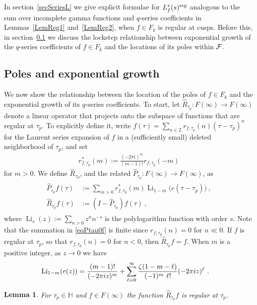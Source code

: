 \documentclass[11pt,a4paper]{article}
\newtheorem{lem}[thm]{Lemma}
\def\Z{\mathbb{Z}}
\newcommand{\Li}{\operatorname{Li}}     			%
\newcommand{\HH}{{\mathbb H}}				%
\newcommand{\reg}{{\rm reg}}
\newcommand{\PF}{\widehat{P}} 				%
\newcommand{\RF}{\widehat{R}} 				%
\begin{document}
In section~\ref{secSeriesL} we give explicit formulae for  $L_f^*(s)^\reg$ analogous to the sum over incomplete gamma functions and $q$-series coefficients in Lemmas~\ref{LemReg1} and~\ref{LemReg2}, when $f \in F_k$ is regular at cusps. Before this, in section~\ref{secGrowLF} we discuss the lockstep relationship between exponential growth of the $q$-series coefficients of $f \in F_k$ and the locations of its poles within ${\cal F}$.

\subsection{Poles and exponential growth}\label{secGrowLF}

We now show the relationship between the location of the poles of $f \in F_k$ and the exponential growth of its $q$-series coefficients. To start, let $\RF_{\tau_p}:F(\infty)\to F(\infty)$ denote a linear operator that projects onto the subspace of functions that are regular at $\tau_p$. To explicitly define it, write $f(\tau)=\sum_{n\in \Z} r_{f,\tau_p}(n) (\tau-\tau_p)^n$ for the Laurent series expansion of $f$ in a (sufficiently small) deleted neighborhood of $\tau_p$, and set
\begin{align}
\label{eqRstar}
r^*_{f,\tau_p}(m):=\frac{(-2\pi i)^m}{(m-1)!}r_{f,\tau_p}(-m)
\end{align} 
for $m>0$. We define $\RF_{\tau_P}$, and the related $\PF_{\tau_p}: F(\infty) \to F(\infty)$, as
\begin{align}
\label{eqPtau0f}
\begin{split}
\PF_{\tau_p}f(\tau)&:=\sum_{m>0}r^*_{f,\tau_p}(m)\Li_{1-m}\big(e(\tau-\tau_p)\big)~,\\
\RF_{\tau_p}f(\tau)&:=(I-\PF_{\tau_p})f(\tau)~,
\end{split}
\end{align}
where $\Li_s(z):=\sum_{n>0}z^nn^{-s}$ is the polylogarithm function with order $s$. Note that the summation in \eqref{eqPtau0f} is finite since $r_{f,\tau_p}(n)=0$ for $n\ll 0$. If $f$ is regular at $\tau_p$, so that $r_{f,\tau_p}(n)=0$ for $n<0$, then $\RF_{\tau_p}f=f$. When $m$ is a positive integer, as $z\to 0$ we have 
\begin{align}\label{eqLaurent}
{\rm Li}_{1-m}(e(z))
&= \frac{(m-1)!}{(-2 \pi i z)^{m}} + \sum_{\ell = 0}^{\infty} \frac{\zeta(1-m-\ell)}{(-1)^{m}~\ell!} (-2 \pi i z)^{\ell}~.
\end{align}

\begin{lem}\label{LemRegC1}
For $\tau_p\in \HH$ and $f\in F(\infty)$ the function $\RF_{\tau_p}f$ is regular at $\tau_p$.
\end{lem}
\end{document}
